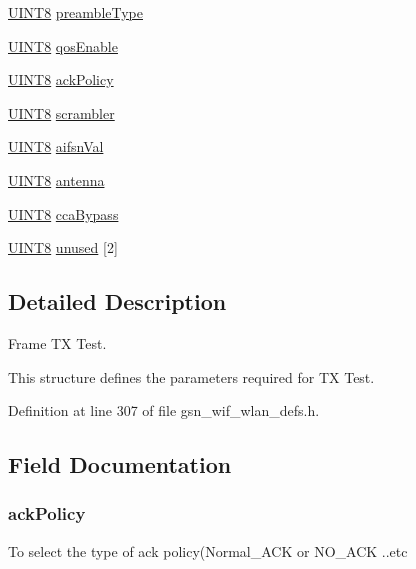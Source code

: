 \begin{DoxyCompactItemize}
\item 
\hyperlink{a00660_gab27e9918b538ce9d8ca692479b375b6a}{UINT8} \hyperlink{a00187_a1af7a22bf7a18ef09da23ae8d0e08d22}{preambleType}
\item 
\hyperlink{a00660_gab27e9918b538ce9d8ca692479b375b6a}{UINT8} \hyperlink{a00187_a701726914e266e9ac77130d4b4f9f809}{qosEnable}
\item 
\hyperlink{a00660_gab27e9918b538ce9d8ca692479b375b6a}{UINT8} \hyperlink{a00187_a1bfb2a932efceac620bf26626a87e8b8}{ackPolicy}
\item 
\hyperlink{a00660_gab27e9918b538ce9d8ca692479b375b6a}{UINT8} \hyperlink{a00187_a808943286ddbb9bc1773a11a1f2c7cb3}{scrambler}
\item 
\hyperlink{a00660_gab27e9918b538ce9d8ca692479b375b6a}{UINT8} \hyperlink{a00187_a8b5e8378081c1e22ff81c12ae15e1bc3}{aifsnVal}
\item 
\hyperlink{a00660_gab27e9918b538ce9d8ca692479b375b6a}{UINT8} \hyperlink{a00187_ad84150bc4d20a5e841d834b269db9901}{antenna}
\item 
\hyperlink{a00660_gab27e9918b538ce9d8ca692479b375b6a}{UINT8} \hyperlink{a00187_a159663bb9fdf56a642427fc865dec9e4}{ccaBypass}
\item 
\hyperlink{a00660_gab27e9918b538ce9d8ca692479b375b6a}{UINT8} \hyperlink{a00187_a06e630c1e888866376c77bea0c8ea6fa}{unused} \mbox{[}2\mbox{]}
\end{DoxyCompactItemize}


\subsection{Detailed Description}
Frame TX Test. 

This structure defines the parameters required for TX Test. 

Definition at line 307 of file gsn\_\-wif\_\-wlan\_\-defs.h.



\subsection{Field Documentation}
\hypertarget{a00187_a1bfb2a932efceac620bf26626a87e8b8}{
\subsubsection[{ackPolicy}]{ {\bf ackPolicy}}}
\label{a00187_a1bfb2a932efceac620bf26626a87e8b8}
To select the type of ack policy(Normal\_\-ACK or NO\_\-ACK ..etc 

